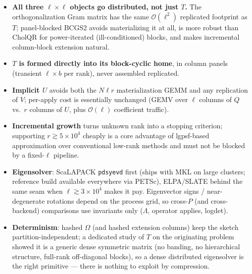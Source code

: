\documentclass[11pt]{article}
\begin{document}
\begin{itemize}
\item \textbf{All three $\ell\times\ell$ objects go distributed, not just $T$.}
  The orthogonalization Gram matrix has the same $\mathcal{O}(\ell^2)$ replicated
  footprint as $T$; panel-blocked BCGS2 avoids materializing it at all, is more
  robust than CholQR for power-iterated (ill-conditioned) blocks, and makes
  incremental column-block extension natural.
\item \textbf{$T$ is formed directly into its block-cyclic home}, in column panels
  (transient $\ell \times b$ per rank), never assembled replicated.
\item \textbf{Implicit $U$} avoids both the $N\ell r$ materialization GEMM and any
  replication of $V$; per-apply cost is essentially unchanged (GEMV over $\ell$
  columns of $Q$ vs.\ $r$ columns of $U$, plus $\mathcal{O}(\ell)$ coefficient
  traffic).
\item \textbf{Incremental growth} turns unknown rank into a stopping criterion;
  supporting $r \gtrsim 5\times 10^4$ cheaply is a core advantage of lgpsf-based
  approximation over conventional low-rank methods and must not be blocked by a
  fixed-$\ell$ pipeline.
\item \textbf{Eigensolver}: ScaLAPACK \texttt{pdsyevd} first (ships with MKL on
  large clusters; reference build available everywhere via PETSc), ELPA/SLATE
  behind the same seam when $\ell \gtrsim 3\times 10^4$ makes it pay.  Eigenvector
  signs / near-degenerate rotations depend on the process grid, so cross-$P$ (and
  cross-backend) comparisons use invariants only ($\Lambda$, operator applies,
  logdet).
\item \textbf{Determinism}: hashed $\Omega$ (and hashed extension columns) keep the
  sketch partition-independent; a dedicated study of $T$ on the originating problem
  showed it is a generic dense symmetric matrix (no banding, no hierarchical
  structure, full-rank off-diagonal blocks), so a dense distributed eigensolver is
  the right primitive --- there is nothing to exploit by compression.
\end{itemize}
\end{document}
